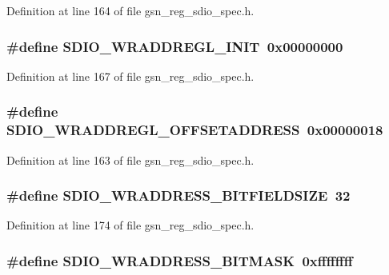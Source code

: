 Definition at line 164 of file gsn\_\-reg\_\-sdio\_\-spec.h.

\hypertarget{a00571_a90d036cf5f37c625857eaee89797d8b5}{
\subsubsection[{SDIO\_\-WRADDREGL\_\-INIT}]{\setlength{\rightskip}{0pt plus 5cm}\#define SDIO\_\-WRADDREGL\_\-INIT~0x00000000}}
\label{a00571_a90d036cf5f37c625857eaee89797d8b5}


Definition at line 167 of file gsn\_\-reg\_\-sdio\_\-spec.h.

\hypertarget{a00571_a57f50e791e3dc34111a78aa678494ad0}{
\subsubsection[{SDIO\_\-WRADDREGL\_\-OFFSETADDRESS}]{\setlength{\rightskip}{0pt plus 5cm}\#define SDIO\_\-WRADDREGL\_\-OFFSETADDRESS~0x00000018}}
\label{a00571_a57f50e791e3dc34111a78aa678494ad0}


Definition at line 163 of file gsn\_\-reg\_\-sdio\_\-spec.h.

\hypertarget{a00571_a16648ce8d0a32a06606e7e27f24634db}{
\subsubsection[{SDIO\_\-WRADDRESS\_\-BITFIELDSIZE}]{\setlength{\rightskip}{0pt plus 5cm}\#define SDIO\_\-WRADDRESS\_\-BITFIELDSIZE~32}}
\label{a00571_a16648ce8d0a32a06606e7e27f24634db}


Definition at line 174 of file gsn\_\-reg\_\-sdio\_\-spec.h.

\hypertarget{a00571_a3cf97ccdc9336c6cdb67c12526afdadb}{
\subsubsection[{SDIO\_\-WRADDRESS\_\-BITMASK}]{\setlength{\rightskip}{0pt plus 5cm}\#define SDIO\_\-WRADDRESS\_\-BITMASK~0xffffffff}}
\label{a00571_a3cf97ccdc9336c6cdb67c12526afdadb}


